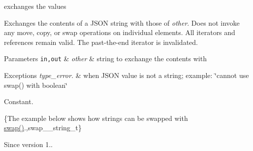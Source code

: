 exchanges the values 

Exchanges the contents of a J\+S\+ON string with those of {\itshape other}. Does not invoke any move, copy, or swap operations on individual elements. All iterators and references remain valid. The past-\/the-\/end iterator is invalidated.


\begin{DoxyParams}[1]{Parameters}
\mbox{\tt in,out}  & {\em other} & string to exchange the contents with\\
\hline
\end{DoxyParams}

\begin{DoxyExceptions}{Exceptions}
{\em type\+\_\+error.} & when J\+S\+ON value is not a string; example\+: {\ttfamily \char`\"{}cannot
use swap() with boolean\char`\"{}}\\
\hline
\end{DoxyExceptions}
Constant.

\{The example below shows how strings can be swapped with {\ttfamily \mbox{\hyperlink{classnlohmann_1_1basic__json_a8c9d932353e1ab98a7dc2fc27e002031}{swap()}}}.,swap\+\_\+\+\_\+string\+\_\+t\}

\begin{DoxySince}{Since}
version 1.. 
\end{DoxySince}
\mbox{\label{classnlohmann_1_1basic__json_a8ca5dd4f18b59e7022b04fd9bf7f5176}} 
